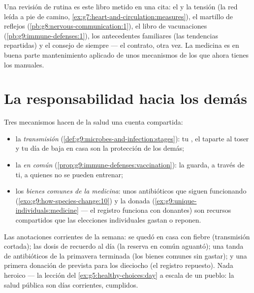 \begin{example}\label{ex:g9:our-responsibility:checkup}
Una revisión de rutina es este libro metido en una cita: el  y la
tensión (la red leída a pie de camino,
\cref{ex:g7:heart-and-circulation:measures}), el martillo de reflejos
(\cref{pb:g8:nervous-communication:1}), el libro de vacunaciones
(\cref{pb:g9:immune-defenses:1}), los antecedentes familiares (las
tendencias repartidas) y el consejo de siempre --- el contrato, otra
vez. La medicina es en buena parte mantenimiento aplicado de unos
mecanismos de los que ahora tienes los manuales.
\end{example}

\section{La responsabilidad hacia los demás}

\begin{proposition}\label{prop:g9:our-responsibility:others}
Tres mecanismos hacen de la salud una cuenta compartida:
\begin{itemize}
  \item la \emph{transmisión}
        (\cref{def:g9:microbes-and-infection:stages}): tu , el
        taparte al toser y tu día de baja en casa son la protección de
        los demás;
  \item la \emph{ en común}
        (\cref{prop:g9:immune-defenses:vaccination}): la 
        guarda, a través de ti, a quienes no se pueden entrenar;
  \item los \emph{bienes comunes de la medicina}: unos antibióticos que
        siguen funcionando (\cref{exo:g9:how-species-change:10}) y la
         donada (\cref{ex:g9:unique-individuals:medicine} --- el
        registro funciona con donantes) son recursos compartidos que
        las elecciones individuales gastan o reponen.
\end{itemize}
\end{proposition}
\admitted

\begin{example}\label{ex:g9:our-responsibility:account}
Las anotaciones corrientes de la semana: se quedó en casa con fiebre
(transmisión cortada); las dosis de recuerdo al día (la reserva en
común aguantó); una tanda de antibióticos de la primavera terminada
(los bienes comunes sin gastar); y una primera donación de 
prevista para los dieciocho (el registro repuesto). Nada heroico --- la
lección del \cref{ex:g5:healthy-choices:day} a escala de un pueblo: la
salud pública son días corrientes, cumplidos.
\end{example}

